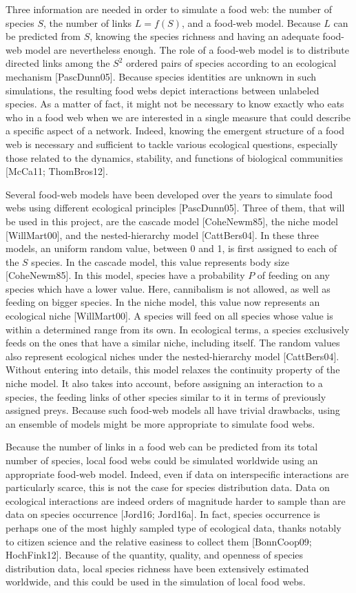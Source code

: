 Three information
are needed in order to simulate a food web: the number of species $S$, the
number of links $L = f(S)$, and a food-web model. Because $L$ can be predicted
from $S$, knowing the species richness and having an adequate food-web model are
nevertheless enough. The role of a food-web model is to distribute directed
links among the $S^2$ ordered pairs of species according to an ecological
mechanism [PascDunn05]. Because species identities are unknown in such
simulations, the resulting food webs depict interactions between unlabeled
species. As a matter of fact, it might not be necessary to know exactly who eats
who in a food web when we are interested in a single measure that could describe
a specific aspect of a network. Indeed, knowing the emergent structure of a food
web is necessary and sufficient to tackle various ecological questions,
especially those related to the dynamics, stability, and functions of biological
communities [McCa11; ThomBros12].

Several food-web models have been developed over the years to simulate food webs
using different ecological principles [PascDunn05]. Three of them, that will be
used in this project, are the cascade model [CoheNewm85], the niche model
[WillMart00], and the nested-hierarchy model [CattBers04]. In these three
models, an uniform random value, between 0 and 1, is first assigned to each of
the $S$ species. In the cascade model, this value represents body size
[CoheNewm85]. In this model, species have a probability $P$ of feeding on any
species which have a lower value. Here, cannibalism is not allowed, as well as
feeding on bigger species. In the niche model, this value now represents an
ecological niche [WillMart00]. A species will feed on all species whose value
is within a determined range from its own. In ecological terms, a species
exclusively feeds on the ones that have a similar niche, including itself. The
random values also represent ecological niches under the nested-hierarchy model
[CattBers04]. Without entering into details, this model relaxes the continuity
property of the niche model. It also takes into account, before assigning an
interaction to a species, the feeding links of other species similar to it in
terms of previously assigned preys. Because such food-web models all have
trivial drawbacks, using an ensemble of models might be more appropriate to
simulate food webs.

Because the number of links in a food web can be  predicted from its total
number of species, local food webs could be simulated worldwide using an
appropriate food-web model. Indeed, even if data on interspecific interactions
are particularly scarce, this is not the case for species distribution data.
Data on ecological interactions are indeed orders of magnitude harder to sample
than are data on species occurrence [Jord16; Jord16a]. In fact, species
occurrence is perhaps one of the most highly sampled type of ecological data,
thanks notably to citizen science and the relative easiness to collect them
[BonnCoop09; HochFink12]. Because of the quantity, quality, and openness of
species distribution data, local species richness have been extensively
estimated worldwide, and this could be used in the simulation of local food
webs.


